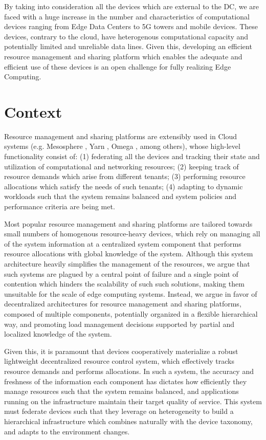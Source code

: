 By taking into consideration all the devices which are external to the DC, we are faced with a huge increase in the number and characteristics of computational devices ranging from Edge Data Centers to 5G towers and mobile devices. These devices, contrary to the cloud, have heterogenous computational capacity and potentially limited and unreliable data lines. Given this, developing an efficient resource management and sharing platform which enables the adequate and efficient use of these devices is an open challenge for fully realizing Edge Computing. 

\section{Context}

Resource management and sharing platforms are extensibly used in Cloud systems (e.g. Mesosphere \cite{hindman2011mesos}, Yarn \cite{Vavilapalli2013ApacheHY}, Omega \cite{41684}, among others), whose high-level functionality consist of: (1) federating all the devices and tracking their state and utilization of computational and networking resources; (2) keeping track of resource demands which arise from different tenants; (3) performing resource allocations which satisfy the needs of such tenants; (4) adapting to dynamic workloads such that the system remains balanced and system policies and performance criteria are being met.

Most popular resource management and sharing platforms are tailored towards small numbers of homogenous resource-heavy devices, which rely on managing all of the system information at a centralized system component that performs resource allocations with global knowledge of the system. Although this system architecture heavily simplifies the management of the resources, we argue that such systems are plagued by a central point of failure and a single point of contention which hinders the scalability of such such solutions, making them unsuitable for the scale of edge computing systems. Instead, we argue in favor of decentralized architectures for resource management and sharing platforms, composed of multiple components, potentially organized in a flexible hierarchical way, and promoting load management decisions supported by partial and localized knowledge of the system.

Given this, it is paramount that devices cooperatively materialize a robust lightweight decentralized resource control system, which effectively tracks resource demands and performs allocations. In such a system, the accuracy and freshness of the information each component has dictates how efficiently they manage resources such that the system remains balanced, and applications running on the infrastructure maintain their target quality of service. This system must federate devices such that they leverage on heterogeneity to build a hierarchical infrastructure which combines naturally with the device taxonomy, and adapts to the environment changes. 

